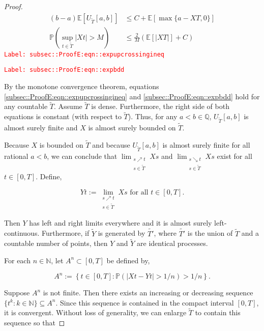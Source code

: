 \documentclass[12pt]{article}
\newcommand{\mb}{\mathbb}
\newcommand{\te}{\text}
\newcommand{\tr}{\textcolor{red}}
\newcommand{\labe}[1]{\tr{\texttt{Label: #1}}}
\newcommand{\ind}{\hspace{24pt}}
\newcommand{\pr}{\mb{P}}							%
\newcommand{\ex}[1]{\mb{E}\left[#1\right]}			%
\newcommand{\T}{T}								%
\renewcommand{\t}{t}							%
\renewcommand{\tt}{s}							%
\newcommand{\X}{X}								%
\newcommand{\const}{C}							%
\newcommand{\sln}[1]{^{#1}}						%
\newcommand{\alt}[1]{\widetilde{#1}}			%
\newcommand{\XX}{Y}								%
\renewcommand{\it}{k}							%
\newcommand{\Tset}{\alt{T}}						%
\newcommand{\typset}{A}							%
\begin{document}
\begin{proof}
\begin{align}
(b-a)\ex{U_{\Tset}[a,b]} &\leq \const{} + \ex{\max\{a-\X{}{\T},0\}}
\label{subsec::ProofE:eqn::expupcrossingineq}\\
\pr\left(\sup_{\t\in\Tset} |\X{}{\t}| > M\right) &\leq \frac{2}{M}\left(\ex{|\X{}{\T}|} + \const{}\right)
\label{subsec::ProofE:eqn::expbdd}
\end{align}
\labe{subsec::ProofE:eqn::expupcrossingineq}

\labe{subsec::ProofE:eqn::expbdd}

By the monotone convergence theorem, equations \eqref{subsec::ProofE:eqn::expupcrossingineq} and \eqref{subsec::ProofE:eqn::expbdd} hold for any countable \(\Tset\). Assume \(\Tset\) is dense. Furthermore, the right side of both equations is constant (with respect to \(\Tset\)). Thus, for any \(a < b \in \mb{Q}\), \(U_{\Tset}[a,b]\) is almost surely finite and \(\X{}{}\) is almost surely bounded on \(\Tset\).

\ind Because \(\X{}{}\) is bounded on \(\Tset\) and because \(U_{\Tset}[a,b]\) is almost surely finite for all rational \(a < b\), we can conclude that \(\lim_{\substack{\tt \nearrow \t\\ \tt \in \Tset}} \X{}{\tt}\) and \(\lim_{\substack{\tt \searrow \t\\ \tt \in \Tset}} \X{}{\tt}\) exist for all \(\t \in [0,\T]\). Define,

\[\XX{}{\t} := \lim_{\substack{\tt \nearrow \t\\\tt \in \Tset}} \X{}{\tt}\te{ for all } \t \in [0,\T].\]

Then \(\XX{}{}\) has left and right limits everywhere and it is almost surely left-continuous. Furthermore, if \(\alt{\XX{}{}}\) is generated by \(\alt{T'}\), where \(\alt{T'}\) is the union of \(\Tset\) and a countable number of points, then \(\XX{}{}\) and \(\alt{\XX{}{}}\) are identical processes. 

\ind For each \(n \in \mb{N}\), let \(\typset\sln{n} \subset [0,\T]\) be defined by,

\[\typset\sln{n} := \left\{\t\in [0,\T]: \pr\left(|\X{}{\t} - \XX{}{\t}| > 1/n\right) > 1/n\right\}.\] 

Suppose \(\typset\sln{n}\) is not finite. Then there exists an increasing or decreasing sequence \(\{\t\sln{\it}:\it\in \mb{N}\}\subseteq \typset\sln{n}\). Since this sequence is contained in the compact interval \([0,\T]\), it is convergent. Without loss of generality, we can enlarge \(\Tset\) to contain this sequence so that


\end{proof}
\end{document}
